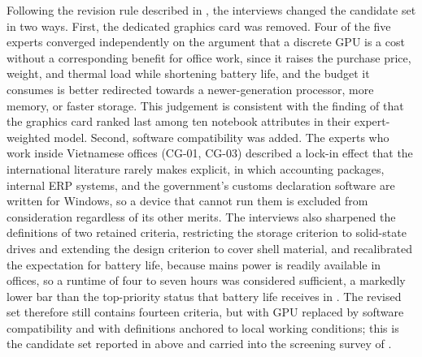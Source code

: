 Following the revision rule described in , the interviews
changed the candidate set in two ways. First, the dedicated graphics card was removed.
Four of the five experts converged independently on the argument that a discrete GPU is a
cost without a corresponding benefit for office work, since it raises the purchase price,
weight, and thermal load while shortening battery life, and the budget it consumes is
better redirected towards a newer-generation processor, more memory, or faster storage.
This judgement is consistent with the finding of \textcite{maghsoudi_hybrid_2026} that the
graphics card ranked last among ten notebook attributes in their expert-weighted model.
Second, software compatibility was added. The experts who work inside Vietnamese offices
(CG-01, CG-03) described a lock-in effect that the international literature rarely makes
explicit, in which accounting packages, internal ERP systems, and the government's customs
declaration software are written for Windows, so a device that cannot run them is excluded
from consideration regardless of its other merits. The interviews also sharpened the
definitions of two retained criteria, restricting the storage criterion to solid-state
drives and extending the design criterion to cover shell material, and recalibrated the
expectation for battery life, because mains power is readily available in offices, so a
runtime of four to seven hours was considered sufficient, a markedly lower bar than the
top-priority status that battery life receives in \textcite{weng_siew_lam_evaluation_2023}.
The revised set therefore still contains fourteen criteria, but with GPU replaced by
software compatibility and with definitions anchored to local working conditions; this is
the candidate set reported in  above and carried into the screening
survey of .

